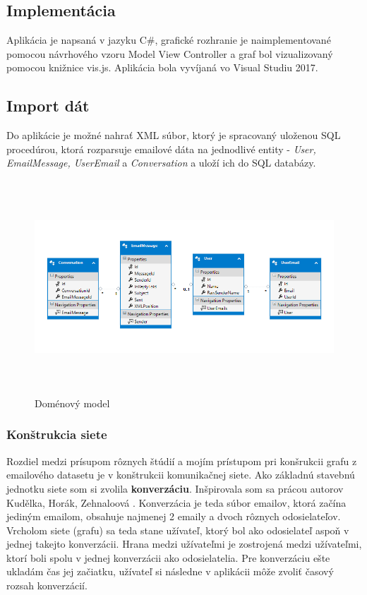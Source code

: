 \documentclass[slovak,master,public,dept460,male,cpdeclaration,oneside]{diploma}
\begin{document}
\subsection{Implementácia}
Aplikácia je napsaná v jazyku C\#, grafické rozhranie je naimplementované pomocou návrhového vzoru Model View Controller a graf bol vizualizovaný pomocou knižnice vis.js. Aplikácia bola vyvíjaná vo Visual Studiu 2017.

\subsection{Import dát}
Do aplikácie je možné nahrať XML súbor, ktorý je spracovaný uloženou SQL procedúrou, ktorá rozparsuje emailové dáta na jednodlivé entity - \textit{User, EmailMessage, UserEmail} a \textit{Conversation} a uloží ich do SQL databázy.


\begin{figure}[H]
\centering
\includegraphics[width=16cm, height=8cm]{figures/domain_model}
\caption{Doménový model}
\end{figure}



\subsubsection{Konštrukcia siete}
Rozdiel medzi prísupom rôznych štúdií a mojím prístupom pri konšrukcii grafu z emailového datasetu je v konštrukcii komunikačnej siete. Ako základnú stavebnú jednotku siete som si zvolila \textbf{konverzáciu}. Inšpirovala som sa prácou autorov Kudělka, Horák, Zehnaloová \cite{10}. Konverzácia je teda súbor emailov, ktorá začína jediným emailom, obsahuje najmenej 2 emaily a dvoch rôznych odosielateľov. Vrcholom siete (grafu) sa teda stane užívateľ, ktorý bol ako odosielateľ aspoň v jednej takejto konverzácii. Hrana medzi užívateľmi je zostrojená medzi užívateľmi, ktorí boli spolu v jednej konverzácii ako odosielatelia. Pre konverzáciu ešte ukladám čas jej začiatku, užívateľ si následne v aplikácii môže zvoliť časový rozsah konverzácií.
\end{document}
